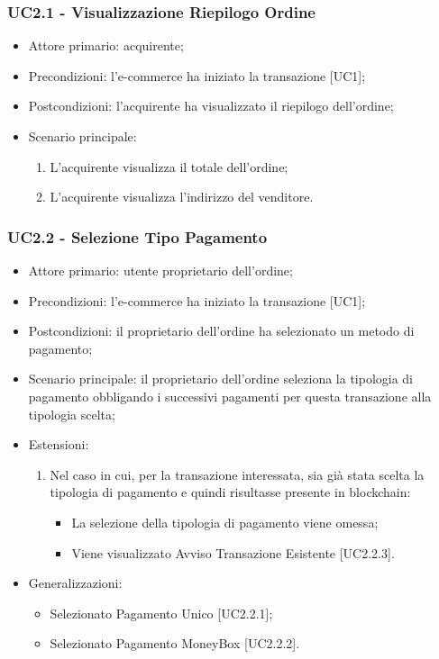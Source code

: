\subsubsection{UC2.1 - Visualizzazione Riepilogo Ordine}\label{sssec: UC2.1}

\begin{itemize}
    \item Attore primario: acquirente;
    \item Precondizioni: l'e-commerce\glo{} ha iniziato la transazione [UC1];
    \item Postcondizioni: l'acquirente ha visualizzato il riepilogo dell'ordine;
    \item Scenario principale:
          \begin{enumerate}
              \item L'acquirente visualizza il totale dell'ordine;
              \item L'acquirente visualizza l'indirizzo del venditore.
          \end{enumerate}
\end{itemize}

\subsubsection{UC2.2 - Selezione Tipo Pagamento}\label{sssec: UC2.2}

\begin{itemize}
    \item Attore primario: utente proprietario dell'ordine;
    \item Precondizioni: l'e-commerce\glo{} ha iniziato la transazione [UC1];
    \item Postcondizioni: il proprietario dell'ordine ha selezionato un metodo di pagamento;
    \item Scenario principale: il proprietario dell'ordine seleziona la tipologia di pagamento obbligando i successivi pagamenti per questa transazione alla tipologia scelta;
    \item Estensioni:
    \begin{enumerate}
    \item Nel caso in cui, per la transazione interessata, sia già stata scelta la tipologia di pagamento e quindi risultasse presente in blockchain\glo{}:
        \begin{itemize}
            \item La selezione della tipologia di pagamento viene omessa;
            \item Viene visualizzato Avviso Transazione Esistente [UC2.2.3].
        \end{itemize}
    \end{enumerate}
    \item Generalizzazioni:
    \begin{itemize}
        \item Selezionato Pagamento Unico [UC2.2.1];
        \item Selezionato Pagamento MoneyBox\glo{} [UC2.2.2].
    \end{itemize}
\end{itemize}

